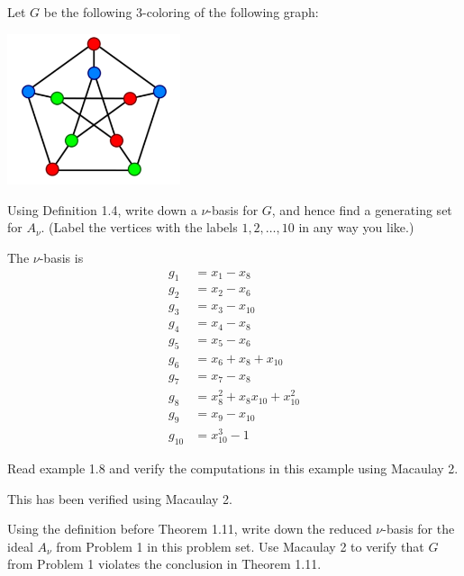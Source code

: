 \documentclass[10pt,letterpaper]{hmcpset}
\newcommand{\aln}[1]{\begin{align*} #1 \end{align*}} %
\begin{document}
\begin{problem}[1]
Let $G$ be the following 3-coloring of the following graph:
\begin{center}
	\includegraphics[width=2in]{3coloring.png}
\end{center}
Using Definition 1.4, write down a $\nu$-basis for $G$, and hence find a generating set for $A_\nu$. (Label the vertices with the labels $1,2,\ldots,10$ in any way you like.)
\end{problem}

\begin{solution}
The $\nu$-basis is
\aln{
	g_1 &= x_1 - x_8\\
	g_2 &= x_2 - x_6\\
	g_3 &= x_3 - x_{10}\\
	g_4 &= x_4 - x_8\\
	g_5 &= x_5 - x_6\\
	g_6 &= x_6 + x_8 + x_{10}\\
	g_7 &= x_7 - x_8\\
	g_8 &= x_8^2 + x_8 x_{10} + x_{10}^2\\
	g_9 &= x_9 - x_{10}\\
	g_{10} &= x_{10}^3 - 1
}
\end{solution}


\begin{problem}[2]
Read example 1.8 and verify the computations in this example using Macaulay 2.
\end{problem}

\begin{solution}
This has been verified using Macaulay 2.
\end{solution}

\newpage

\begin{problem}[3]
Using the definition before Theorem 1.11, write down the reduced $\nu$-basis for the ideal $A_\nu$ from Problem 1 in this problem set. Use Macaulay 2 to verify that $G$ from Problem 1 violates the conclusion in Theorem 1.11.
\end{problem}
\end{document}
